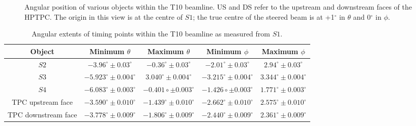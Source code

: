 \begin{figure}[ht]
  \begin{adjustbox}{max totalsize={0.7\textwidth}{.5\textheight},center}
    
  \end{adjustbox}
  \caption{Angular position of various objects within the T10 beamline. US and DS refer to the upstream and downstream faces of the HPTPC. The origin in this view is at the centre of $\mathit{S1}$; the true centre of the steered beam is at +1$^{\circ}$ in $\theta$ and 0$^{\circ}$ in $\phi$.}
  \label{fig:angularDistS1}
\end{figure}

\begin{table}
  \centering
  \caption{Angular extents of timing points within the T10 beamline as measured from $\mathit{S1}$.}
  \begin{tabular}{|c|c|c|c|c|}
    \hline
    Object & Minimum $\theta$ & Maximum $\theta$ & Minimum $\phi$ & Maximum $\phi$ \\
    \hline
    $\mathit{S2}$ & $-3.96^{\circ} \pm 0.03^{\circ}$ & $-0.36^{\circ} \pm 0.03^{\circ}$ & $-2.01^{\circ} \pm 0.03^{\circ}$ & $2.94^{\circ} \pm 0.03^{\circ}$ \\
    $\mathit{S3}$ & $-5.923^{\circ} \pm 0.004^{\circ}$ & $3.040^{\circ} \pm 0.004^{\circ}$ & $-3.215^{\circ} \pm 0.004^{\circ}$ & $3.344^{\circ} \pm 0.004^{\circ}$ \\
   $\mathit{S4}$ & $-6.083^{\circ} \pm 0.003^{\circ}$ & $-0.401{\circ} \pm 0.003^{\circ}$ & $-1.426{\circ} \pm 0.003^{\circ}$ & $1.771^{\circ} \pm 0.003^{\circ}$ \\
    TPC upstream face & $-3.590^{\circ} \pm 0.010^{\circ}$ & $-1.439^{\circ} \pm 0.010^{\circ}$ & $-2.662^{\circ} \pm 0.010^{\circ}$ & $2.575^{\circ} \pm 0.010^{\circ}$ \\
    TPC downstream face & $-3.778^{\circ} \pm 0.009^{\circ}$ & $-1.806^{\circ} \pm 0.009^{\circ}$ & $-2.440^{\circ} \pm 0.009^{\circ}$ & $2.361^{\circ} \pm 0.009^{\circ}$ \\
    \hline
  \end{tabular}
  \label{tab:angS1}
\end{table}

